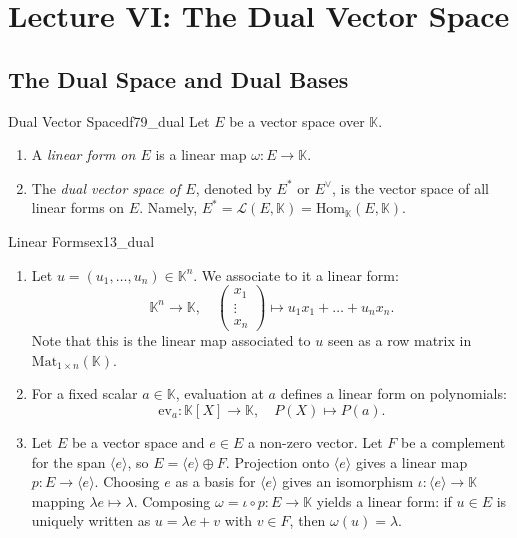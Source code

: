 \documentclass[11pt, a4paper]{article}
\newcommand{\K}{\mathbb{K}}
\begin{document}
\section{Lecture VI: The Dual Vector Space}

\subsection{The Dual Space and Dual Bases}

\begin{definition}{Dual Vector Space}{df79_dual}
  Let $E$ be a vector space over $\K$.
  \begin{enumerate}
    \item A \emph{linear form on $E$} is a linear map $\omega: E \to \K$.
    \item The \emph{dual vector space of $E$}, denoted by $E^*$ or $E^\vee$, is the vector space of all linear forms on $E$. Namely, $E^* = \mathcal{L}(E, \K) = \text{Hom}_\K(E, \K)$.
  \end{enumerate}
\end{definition}

\begin{example}{Linear Forms}{ex13_dual}
  \begin{enumerate}
    \item Let $u = (u_1, \dots, u_n) \in \K^n$. We associate to it a linear form:
    \[
      \K^n \longrightarrow \K, \quad \begin{pmatrix} x_1 \\ \vdots \\ x_n \end{pmatrix} \longmapsto u_1 x_1 + \dots + u_n x_n.
    \]
    Note that this is the linear map associated to $u$ seen as a row matrix in $\text{Mat}_{1 \times n}(\K)$.
    
    \item For a fixed scalar $a \in \K$, evaluation at $a$ defines a linear form on polynomials:
    \[
      \text{ev}_a: \K[X] \longrightarrow \K, \quad P(X) \longmapsto P(a).
    \]
    
    \item Let $E$ be a vector space and $e \in E$ a non-zero vector. Let $F$ be a complement for the span $\langle e \rangle$, so $E = \langle e \rangle \oplus F$. Projection onto $\langle e \rangle$ gives a linear map $p: E \to \langle e \rangle$. Choosing $e$ as a basis for $\langle e \rangle$ gives an isomorphism $\iota: \langle e \rangle \to \K$ mapping $\lambda e \mapsto \lambda$. Composing $\omega = \iota \circ p: E \to \K$ yields a linear form: if $u \in E$ is uniquely written as $u = \lambda e + v$ with $v \in F$, then $\omega(u) = \lambda$.
  \end{enumerate}
\end{example}
\end{document}
